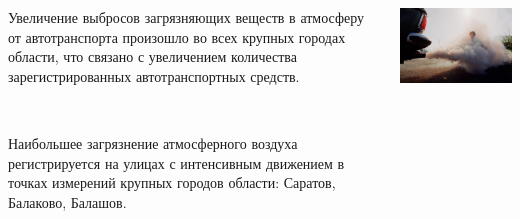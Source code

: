 \begin{frame}{\insertsectionhead}
    \begin{columns}
        \begin{column}{.55\linewidth}
        \footnotesize
        Увеличение выбросов загрязняющих веществ в атмосферу от 
        автотранспорта произошло во всех крупных городах области, что связано с увеличением количества зарегистрированных автотранспортных средств.
        
        ~ %

        Наибольшее загрязнение атмосферного воздуха регистрируется на улицах с 
        интенсивным движением в точках измерений крупных
        городов области: Саратов, Балаково, Балашов.
        \end{column}

        \begin{column}{.42\linewidth}
            \includegraphics[width=1.1\textwidth]{assets/vihlopi.jpg}
        \end{column}
    \end{columns}
\end{frame}
